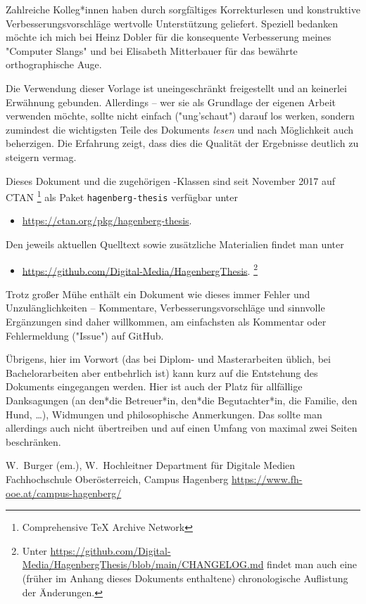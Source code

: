 Zahlreiche Kolleg*innen haben durch sorgfältiges Korrekturlesen und
konstruktive Verbesserungsvorschläge wertvolle Unterstützung geliefert.
Speziell bedanken möchte ich mich bei Heinz Dobler für die konsequente
Verbesserung meines "Computer Slangs" und bei Elisabeth Mitterbauer für das
bewährte orthographische Auge.

Die Verwendung dieser Vorlage ist uneingeschränkt freigestellt und an
keinerlei Erwähnung gebunden. Allerdings -- wer sie als Grundlage der eigenen
Arbeit verwenden möchte, sollte nicht einfach ("ung'schaut") darauf los
werken, sondern zumindest die wichtigsten Teile des Dokuments \emph{lesen}
und nach Möglichkeit auch beherzigen. Die Erfahrung zeigt, dass dies die
Qualität der Ergebnisse deutlich zu steigern vermag.

Dieses Dokument und die zugehörigen \latex-Klassen sind seit November 2017
auf CTAN%
\footnote{Comprehensive TeX Archive Network} 
als Paket \texttt{hagenberg-thesis} verfügbar unter
%
\begin{itemize}
    \item[]\url{https://ctan.org/pkg/hagenberg-thesis}.
\end{itemize}
%
Den jeweils aktuellen Quelltext sowie zusätzliche Materialien findet man unter
%
\begin{itemize}
    \item[]\url{https://github.com/Digital-Media/HagenbergThesis}.%
    \footnote{Unter
    \url{https://github.com/Digital-Media/HagenbergThesis/blob/main/CHANGELOG.md}
    findet man auch eine (früher im Anhang dieses Dokuments enthaltene)
    chronologische Auflistung der Änderungen.}
\end{itemize}

\noindent
Trotz großer Mühe enthält ein Dokument wie dieses immer Fehler und
Unzulänglichkeiten -- Kommentare, Verbesserungsvorschläge und sinnvolle
Ergänzungen sind daher willkommen, am einfachsten als Kommentar oder
Fehlermeldung ("Issue") auf GitHub.

Übrigens, hier im Vorwort (das bei Diplom- und Masterarbeiten üblich, bei
Bachelor\-arbeiten aber entbehrlich ist) kann kurz auf die Entstehung des
Dokuments eingegangen werden. Hier ist auch der Platz für allfällige
Danksagungen (\zB an den*die Betreuer*in, den*die Begutachter*in, die
Familie, den Hund, \ldots), Widmungen und philosophische Anmerkungen. Das
sollte man allerdings auch nicht übertreiben und auf einen Umfang von maximal
zwei Seiten beschränken.

\vspace{6ex}
\noindent
W.\ Burger (em.), W.\ Hochleitner\newline
Department für Digitale Medien\newline
Fachhochschule Oberösterreich, Campus Hagenberg\newline
\url{https://www.fh-ooe.at/campus-hagenberg/}

